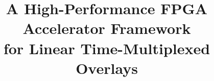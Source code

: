 \documentclass[conference]{IEEEtran}
\begin{document}
	
	\title{A High-Performance FPGA Accelerator Framework \\for Linear Time-Multiplexed Overlays\\
	}
	
	\begin{comment}
	\author{\IEEEauthorblockN{1\textsuperscript{st} Given Name Surname}
	\IEEEauthorblockA{\textit{dept. name of organization (of Aff.)} \\
	\textit{name of organization (of Aff.)}\\
	City, Country \\
	email address}
	\and
	\IEEEauthorblockN{2\textsuperscript{nd} Given Name Surname}
	\IEEEauthorblockA{\textit{dept. name of organization (of Aff.)} \\
	\textit{name of organization (of Aff.)}\\
	City, Country \\
	email address}
	\and
	\IEEEauthorblockN{3\textsuperscript{rd} Given Name Surname}
	\IEEEauthorblockA{\textit{dept. name of organization (of Aff.)} \\
	\textit{name of organization (of Aff.)}\\
	City, Country \\
	email address}
	\and
	\IEEEauthorblockN{4\textsuperscript{th} Given Name Surname}
	\IEEEauthorblockA{\textit{dept. name of organization (of Aff.)} \\
	\textit{name of organization (of Aff.)}\\
	City, Country \\
	email address}
	\and
	\IEEEauthorblockN{5\textsuperscript{th} Given Name Surname}
	\IEEEauthorblockA{\textit{dept. name of organization (of Aff.)} \\
	\textit{name of organization (of Aff.)}\\
	City, Country \\
	email address}
	\and
	\IEEEauthorblockN{6\textsuperscript{th} Given Name Surname}
	\IEEEauthorblockA{\textit{dept. name of organization (of Aff.)} \\
	\textit{name of organization (of Aff.)}\\
	City, Country \\
	email address}
	}
	\end{comment}
	
	\maketitle
	
\end{document}
